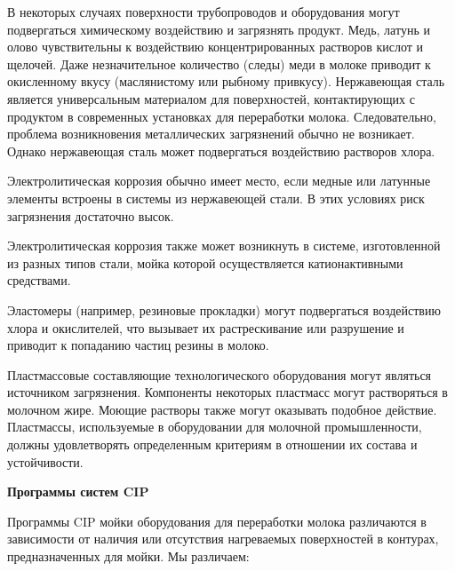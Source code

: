 \documentclass[a4paper,12pt,oneside]{extarticle}
\begin{document}
\begin{flushleft}
В некоторых случаях поверхности трубопроводов и оборудования могут подвергаться химическому воздействию и загрязнять продукт. Медь, латунь и олово чувствительны к воздействию концентрированных растворов кислот и щелочей. Даже незначительное количество (следы) меди в молоке приводит к окисленному вкусу (маслянистому или рыбному привкусу). Нержавеющая сталь является универсальным материалом для поверхностей, контактирующих с продуктом в современных установках для переработки молока. Следовательно, проблема возникновения металлических загрязнений обычно не возникает. Однако нержавеющая сталь может подвергаться воздействию растворов хлора.
\end{flushleft}
 
\begin{flushleft}
		Электролитическая коррозия обычно имеет место, если медные или латунные элементы встроены в системы из нержавеющей стали. В этих условиях риск загрязнения достаточно высок.
\end{flushleft}	

\begin{flushleft}
Электролитическая коррозия также может возникнуть в системе, изготовленной из разных типов стали, мойка которой осуществляется катионактивными средствами.
\end{flushleft}
 
\begin{flushleft}
	Эластомеры (например, резиновые прокладки) могут подвергаться воздействию хлора и окислителей, что вызывает их растрескивание или разрушение и приводит к попаданию частиц резины в молоко.
\end{flushleft}	

\begin{flushleft}
	Пластмассовые составляющие технологического оборудования могут являться источником загрязнения. Компоненты некоторых пластмасс могут растворяться в молочном жире. Моющие растворы также могут оказывать подобное действие. Пластмассы, используемые в оборудовании для молочной промышленности, должны удовлетворять определенным критериям в отношении их состава и устойчивости.
\end{flushleft}
 
\begin{flushleft}
	\bfseries 	Программы систем CIP
\end{flushleft}	

\begin{flushleft}
	Программы CIP мойки оборудования для переработки молока различаются в зависимости от наличия или отсутствия нагреваемых поверхностей в контурах, предназначенных для мойки. Мы различаем:
\end{flushleft}
 
\end{document}
